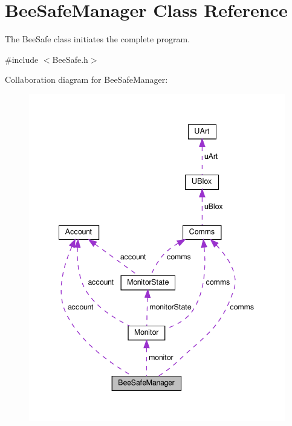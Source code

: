 \hypertarget{class_bee_safe_manager}{}\section{Bee\+Safe\+Manager Class Reference}
\label{class_bee_safe_manager}


The Bee\+Safe class initiates the complete program.  




{\ttfamily \#include $<$Bee\+Safe.\+h$>$}



Collaboration diagram for Bee\+Safe\+Manager\+:\nopagebreak
\begin{figure}[H]
\begin{center}
\leavevmode
\includegraphics[width=341pt]{d7/d13/class_bee_safe_manager__coll__graph}
\end{center}
\end{figure}
